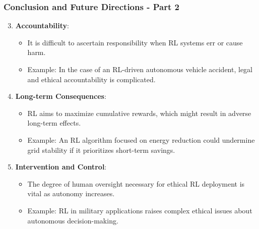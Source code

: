 \documentclass[aspectratio=169]{beamer}
\begin{document}
\begin{frame}[fragile]
    \frametitle{Conclusion and Future Directions - Part 2}
    \begin{enumerate}
        \setcounter{enumi}{2} %
        \item \textbf{Accountability}:
        \begin{itemize}
            \item It is difficult to ascertain responsibility when RL systems err or cause harm.
            \item Example: In the case of an RL-driven autonomous vehicle accident, legal and ethical accountability is complicated.
        \end{itemize}
        
        \item \textbf{Long-term Consequences}:
        \begin{itemize}
            \item RL aims to maximize cumulative rewards, which might result in adverse long-term effects.
            \item Example: An RL algorithm focused on energy reduction could undermine grid stability if it prioritizes short-term savings.
        \end{itemize}
        
        \item \textbf{Intervention and Control}:
        \begin{itemize}
            \item The degree of human oversight necessary for ethical RL deployment is vital as autonomy increases.
            \item Example: RL in military applications raises complex ethical issues about autonomous decision-making.
        \end{itemize}
    \end{enumerate}
\end{frame}
\end{document}
